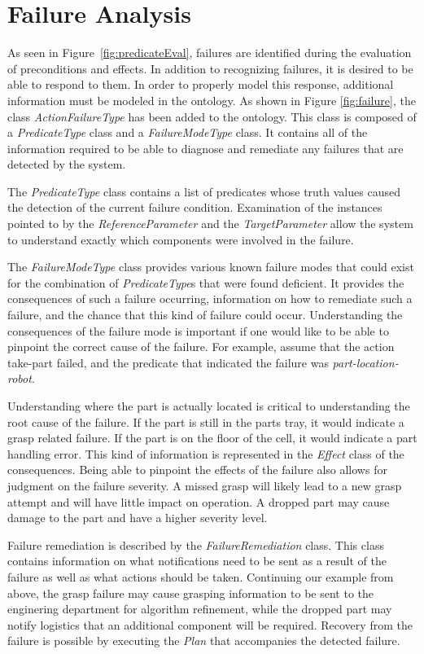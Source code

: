 \section{Failure Analysis}
\label{sect:failure}
As seen in Figure~\ref{fig:predicateEval}, failures are identified during the evaluation of preconditions and effects. 
In addition to recognizing failures, it is desired to be able to respond to them.
In order to properly model this response, additional information must be modeled
in the ontology. As shown in Figure \ref{fig:failure}, the class {\it ActionFailureType} has been added to the ontology. This class is composed of a {\it PredicateType} class and a {\it FailureModeType} class. It contains all of the information required to be able to diagnose and remediate any failures that are detected by the system.

The {\it PredicateType} class contains a list of predicates whose truth values caused the detection of the current failure condition. Examination of the instances pointed to by the {\it ReferenceParameter} and the {\it TargetParameter} allow the system to understand exactly which components were involved in the failure.

The {\it FailureModeType} class provides various known failure modes that could exist for the combination of {\it PredicateType}s that were found deficient. It provides the consequences of such a failure occurring, information on how to remediate such a failure, and the chance that this kind of failure could occur. Understanding the consequences of the failure mode is important if one would like to be able to
pinpoint the correct cause of the failure. For example, assume that the action {\sc take-part} failed, and the predicate that indicated the failure was {\it part-location-robot}. 

Understanding where the part is actually located is critical to understanding the root cause of the failure. If the part is still in the parts tray, it would indicate a grasp related failure. If the part is on the floor of the cell, it would indicate a part handling error. This kind of information is represented in the {\it Effect} class of the consequences. Being able to pinpoint the effects of the failure also allows for judgment on the failure severity. A missed grasp will likely lead to a new grasp attempt and will have little impact on operation. A dropped part may cause damage to the part and have a higher severity level.

Failure remediation is described by the {\it FailureRemediation} class. This class contains information on what notifications need to be sent as a result of the failure as well as what actions should be taken. Continuing our example from above, the grasp failure may cause grasping information to be sent to the enginering department for algorithm refinement, while the dropped part may notify logistics that an additional component will be required. Recovery from the failure is possible by executing the {\it Plan} that accompanies the detected failure.
